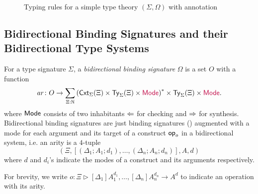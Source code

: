 \documentclass[acmsmall,screen]{acmart}
\theoremstyle{acmdefinition}
\begin{document}
\begin{figure}
  \centering
  \small
  \caption{Typing rules for a simple type theory $(\Sigma, \Omega)$ with annotation}
  \label{fig:extrinsic-typing}
\end{figure}

\subsection{Bidirectional Binding Signatures and their Bidirectional Type Systems}

\begin{definition}
  For a type signature $\Sigma$, a \emph{bidirectional binding signature} $\Omega$ is a set $O$ with a function
  \[
    \mathit{ar}\colon O \to \sum_{\Xi : \mathbb{N}} \left(\mathsf{Cxt}_{\Sigma}(\Xi) \times \mathsf{Ty}_{\Sigma}(\Xi) \times {\mathrel{\textcolor{purple}{\mathsf{Mode}}}}\right)^* \times \mathsf{Ty}_{\Sigma}(\Xi) \times {\mathrel{\textcolor{purple}{\mathsf{Mode}}}}.
  \]
  where $\mathsf{Mode}$ consists of two inhabitants $\Leftarrow$ for checking and $\Rightarrow$ for synthesis.
  Bidirectional binding signatures are just binding signatures () augmented with a mode for each argument and its target of a construct $\mathsf{op}_o$ in a bidirectional system, i.e.
  an arity is a $4$-tuple
  \[
    \left(\Xi, \left[\left(\Delta_1; A_1; d_1\right), \ldots, \left(\Delta_{n}; A_{n}; d_n\right) \right], A, d\right)
  \]
  where $d$ and $d_i$'s indicate the modes of a construct and its arguments respectively.

  For brevity, we write $o \colon \Xi \rhd [\Delta_1]A_{1}^{d_1}, \ldots, [\Delta_{n}] A^{d_n}_{n} \to A^{d}$ to indicate an operation with its arity. 
\end{definition}
\end{document}
